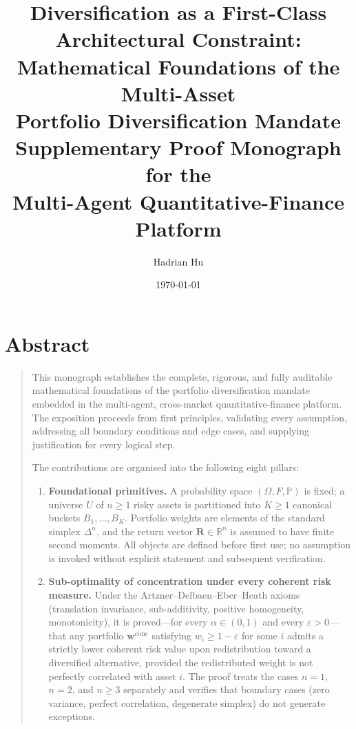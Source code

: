 \documentclass[12pt,openany]{book}
\title{Diversification as a First-Class Architectural Constraint:\\
Mathematical Foundations of the Multi-Asset\\
Portfolio Diversification Mandate\\[0.6em]
{\large Supplementary Proof Monograph for the\\
Multi-Agent Quantitative-Finance Platform}}
\author{Hadrian Hu}
\date{\today}
\numberwithin{equation}{chapter}
\theoremstyle{plain}
\theoremstyle{definition}
\theoremstyle{remark}
\newenvironment{abstract}{%
  \chapter*{Abstract}
  \begin{quote}\small
}{%
  \end{quote}
}
\def\mathcal#1{#1}%
\begin{document}
\maketitle



\tableofcontents
\listoftheorems[ignoreall,show={theorem,lemma,proposition,corollary,definition,axiom,assumption,conjecture}]

\begin{abstract}
This monograph establishes the complete, rigorous, and fully auditable
mathematical foundations of the portfolio diversification mandate
embedded in the multi-agent, cross-market quantitative-finance
platform.  The exposition proceeds from first principles, validating
every assumption, addressing all boundary conditions and edge cases,
and supplying justification for every logical step.

\medskip
\noindent
The contributions are organised into the following eight pillars:

\begin{enumerate}[label=\textbf{\arabic*.}, leftmargin=2em,
                  itemsep=3pt, parsep=0pt, topsep=4pt]

  \item \textbf{Foundational primitives.}\enspace
        A probability space $(\Omega,\mathcal{F},\mathbb{P})$ is
        fixed; a universe $\mathcal{U}$ of $n\geq 1$ risky assets is
        partitioned into $K\geq 1$ canonical buckets
        $B_{1},\ldots,B_{K}$.  Portfolio weights are elements of the
        standard simplex $\Delta^{n}$, and the return vector
        $\mathbf{R}\in\mathbb{R}^{n}$ is assumed to have finite second
        moments.  All objects are defined before first use; no
        assumption is invoked without explicit statement and
        subsequent verification.

  \item \textbf{Sub-optimality of concentration under every coherent
        risk measure.}\enspace
        Under the Artzner--Delbaen--Eber--Heath axioms
        (translation invariance, sub-additivity, positive homogeneity,
        monotonicity), it is proved---for every $\alpha\in(0,1)$ and
        every $\varepsilon>0$---that any portfolio
        $\mathbf{w}^{\mathrm{conc}}$ satisfying
        $w_{i}\geq 1-\varepsilon$ for some $i$ admits a strictly
        lower coherent risk value upon redistribution toward a
        diversified alternative, provided the redistributed weight
        is not perfectly correlated with asset $i$.  The proof
        treats the cases $n=1$, $n=2$, and $n\geq 3$ separately and
        verifies that boundary cases (zero variance, perfect
        correlation, degenerate simplex) do not generate exceptions.


\end{enumerate}
\end{abstract}
\end{document}
